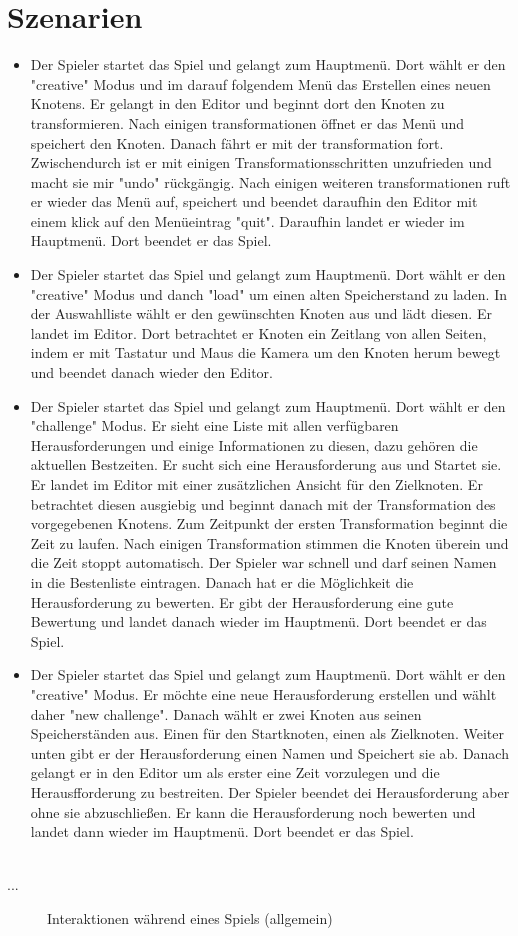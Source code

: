 	
\clearpage
	
\section{Szenarien}
\begin{itemize}	
\item Der Spieler startet das Spiel und gelangt zum Hauptmenü. Dort wählt er den "creative" Modus und im darauf folgendem Menü das Erstellen eines neuen Knotens. Er gelangt in den Editor und beginnt dort den Knoten zu transformieren. Nach einigen transformationen öffnet er das Menü und speichert den Knoten. Danach fährt er mit der transformation fort. Zwischendurch ist er mit einigen Transformationsschritten unzufrieden und macht sie mir "undo" rückgängig. Nach einigen weiteren transformationen ruft er wieder das Menü auf, speichert und beendet daraufhin den Editor mit einem klick auf den Menüeintrag "quit". Daraufhin landet er wieder im Hauptmenü. Dort beendet er das Spiel.

\item Der Spieler startet das Spiel und gelangt zum Hauptmenü. Dort wählt er den "creative" Modus und danch "load" um einen alten Speicherstand zu laden. In der Auswahlliste wählt er den gewünschten Knoten aus und lädt diesen. Er landet im Editor. Dort betrachtet er Knoten ein Zeitlang von allen Seiten, indem er mit Tastatur und Maus die Kamera um den Knoten herum bewegt und beendet danach wieder den Editor.

\item  Der Spieler startet das Spiel und gelangt zum Hauptmenü. Dort wählt er den "challenge" Modus. Er sieht eine Liste mit allen verfügbaren Herausforderungen und einige Informationen zu diesen, dazu gehören die aktuellen Bestzeiten. Er sucht sich eine Herausforderung aus und Startet sie. Er landet im Editor mit einer zusätzlichen Ansicht für den Zielknoten. Er betrachtet diesen ausgiebig und beginnt danach mit der Transformation des vorgegebenen Knotens. Zum Zeitpunkt der ersten Transformation beginnt die Zeit zu laufen. Nach einigen Transformation stimmen die Knoten überein und die Zeit stoppt automatisch. Der Spieler war schnell und darf seinen Namen in die Bestenliste eintragen. Danach hat er die Möglichkeit die Herausforderung zu bewerten. Er gibt der Herausforderung eine gute Bewertung und landet danach wieder im Hauptmenü. Dort beendet er das Spiel.

\item Der Spieler startet das Spiel und gelangt zum Hauptmenü. Dort wählt er den "creative" Modus. Er möchte eine neue Herausforderung erstellen und wählt daher "new challenge". Danach wählt er zwei Knoten aus seinen Speicherständen aus. Einen für den Startknoten, einen als Zielknoten. Weiter unten gibt er der Herausforderung einen Namen und Speichert sie ab. Danach gelangt er in den Editor um als erster eine Zeit vorzulegen und die Herausfforderung zu bestreiten. Der Spieler beendet dei Herausforderung aber ohne sie abzuschließen. Er kann die Herausforderung noch bewerten und landet dann wieder im Hauptmenü. Dort beendet er das Spiel.
\end{itemize}

~\\
...

	\begin{figure}[ht]
	  \centering
	  
	  \caption{Interaktionen während eines Spiels (allgemein)}
	\end{figure}


